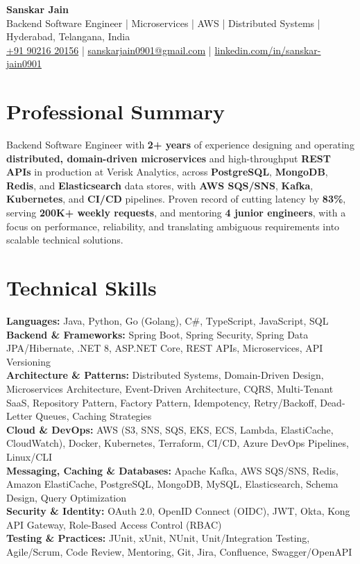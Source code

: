 \documentclass[a4paper,10pt]{article}
\begin{document}
\begin{center}
    {\LARGE \textbf{Sanskar Jain}} \\
    \vspace{2pt}
    Backend Software Engineer \;|\; Microservices \;|\; AWS \;|\; Distributed Systems \;|\; Hyderabad, Telangana, India \\
    \href{tel:+919021620156}{+91 90216 20156} \;|\;
    \href{mailto:sanskarjain0901@gmail.com}{sanskarjain0901@gmail.com} \;|\;
    \href{https://www.linkedin.com/in/sanskar-jain0901/}{linkedin.com/in/sanskar-jain0901}
\end{center}

\section*{Professional Summary}
Backend Software Engineer with \textbf{2+ years} of experience designing and operating \textbf{distributed, domain-driven microservices} and high-throughput \textbf{REST APIs} in production at Verisk Analytics, across \textbf{PostgreSQL}, \textbf{MongoDB}, \textbf{Redis}, and \textbf{Elasticsearch} data stores, with \textbf{AWS SQS/SNS}, \textbf{Kafka}, \textbf{Kubernetes}, and \textbf{CI/CD} pipelines.
Proven record of cutting latency by \textbf{83\%}, serving \textbf{200K+ weekly requests}, and mentoring \textbf{4 junior engineers}, with a focus on performance, reliability, and translating ambiguous requirements into scalable technical solutions.

\section*{Technical Skills}
\begin{sloppypar}
\noindent
\textbf{Languages:} Java, Python, Go (Golang), C\#, TypeScript, JavaScript, SQL \\
\textbf{Backend \& Frameworks:} Spring Boot, Spring Security, Spring Data JPA/Hibernate, .NET 8, ASP.NET Core, REST APIs, Microservices, API Versioning \\
\textbf{Architecture \& Patterns:} Distributed Systems, Domain-Driven Design, Microservices Architecture, Event-Driven Architecture, CQRS, Multi-Tenant SaaS, Repository Pattern, Factory Pattern, Idempotency, Retry/Backoff, Dead-Letter Queues, Caching Strategies \\
\textbf{Cloud \& DevOps:} AWS (S3, SNS, SQS, EKS, ECS, Lambda, ElastiCache, CloudWatch), Docker, Kubernetes, Terraform, CI/CD, Azure DevOps Pipelines, Linux/CLI \\
\textbf{Messaging, Caching \& Databases:} Apache Kafka, AWS SQS/SNS, Redis, Amazon ElastiCache, PostgreSQL, MongoDB, MySQL, Elasticsearch, Schema Design, Query Optimization \\
\textbf{Security \& Identity:} OAuth 2.0, OpenID Connect (OIDC), JWT, Okta, Kong API Gateway, Role-Based Access Control (RBAC) \\
\textbf{Testing \& Practices:} JUnit, xUnit, NUnit, Unit/Integration Testing, Agile/Scrum, Code Review, Mentoring, Git, Jira, Confluence, Swagger/OpenAPI
\end{sloppypar}
\end{document}
